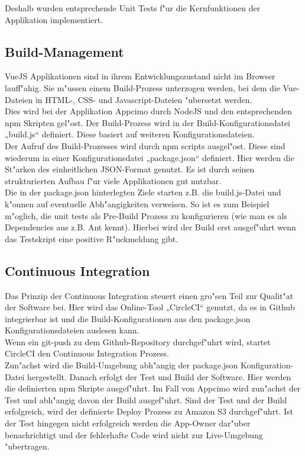 \documentclass[a4paper, 11pt]{scrreprt}
\begin{document}
Deshalb wurden entsprechende Unit Tests f"ur die Kernfunktionen der Applikation implementiert.

\subsection{Build-Management}
VueJS Applikationen sind in ihrem Entwicklungszustand nicht im Browser lauff"ahig. Sie m"ussen einem Build-Prozess unterzogen werden, bei dem die Vue-Dateien in HTML-, CSS- und Javascript-Dateien "ubersetzt werden.\\

Dies wird bei der Applikation Appcimo durch NodeJS und den entsprechenden npm Skripten gel"ost. Der Build-Prozess wird in der Build-Konfigurationsdatei „build.js“ definiert. Diese basiert auf weiteren Konfigurationsdateien. \\
Der Aufruf des Build-Prozesses wird durch npm scripts ausgel"ost. Diese sind wiederum in einer Konfigurationsdatei „package.json“ definiert. Hier werden die St"arken des einheitlichen JSON-Format genutzt. Es ist durch seinen strukturierten Aufbau f"ur viele Applikationen gut nutzbar.\\

Die in der package.json hinterlegten Ziele starten z.B. die build.js-Datei und k"onnen auf eventuelle Abh"angigkeiten verweisen. So ist es zum Beispiel m"oglich, die unit tests als Pre-Build Prozess zu konfigurieren (wie man es als Dependencies aus z.B. Ant kennt). Hierbei wird der Build erst ausgef"uhrt wenn das Testskript eine positive R"uckmeldung gibt.

\subsection{Continuous Integration}
Das Prinzip der Continuous Integration steuert einen gro"sen Teil zur Qualit"at der Software bei. Hier wird das Online-Tool „CircleCI“ genutzt, da es in Github integrierbar ist und die Build-Konfigurationen aus den package.json Konfigurationsdateien auslesen kann.\\

Wenn ein git-push zu dem Github-Repository durchgef"uhrt wird, startet CircleCI den Continuous Integration Prozess.\\

Zun"achst wird die Build-Umgebung abh"angig der package.json Konfiguration-Datei hergestellt. Danach erfolgt der Test und Build der Software. Hier werden die definierten npm Skripte ausgef"uhrt. Im Fall von Appcimo wird zun"achst der Test und abh"angig davon der Build ausgef"uhrt. Sind der Test und der Build erfolgreich, wird der definierte Deploy Prozess zu Amazon S3 durchgef"uhrt. Ist der Test hingegen nicht erfolgreich werden die App-Owner dar"uber benachrichtigt und der fehlerhafte Code wird nicht zur Live-Umgebung "ubertragen.
\end{document}
